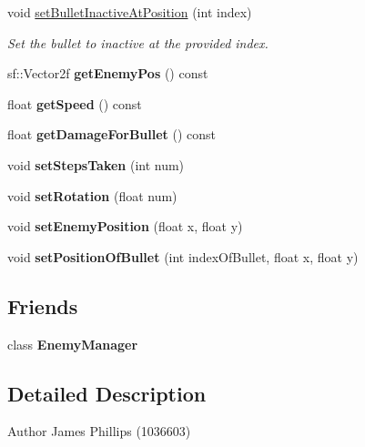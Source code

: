 \begin{DoxyCompactItemize}
void \hyperlink{class_enemy_a02e1cacf8fad39bbcc28271a53637024}{set\+Bullet\+Inactive\+At\+Position} (int index)
\begin{DoxyCompactList}\small\item\em Set the bullet to inactive at the provided index. \end{DoxyCompactList}\item 
\mbox{\label{class_enemy_a9f5b6b7b70f7f3532e82eebcab2e26e8}} 
sf\+::\+Vector2f {\bfseries get\+Enemy\+Pos} () const
\item 
\mbox{\label{class_enemy_a342051a8cf9fe6e329774e37af486fca}} 
float {\bfseries get\+Speed} () const
\item 
\mbox{\label{class_enemy_a73e88b0f1e68650e6ea536c53a3cf920}} 
float {\bfseries get\+Damage\+For\+Bullet} () const
\item 
\mbox{\label{class_enemy_a8ddda321d45a2fa6f35272087afe258b}} 
void {\bfseries set\+Steps\+Taken} (int num)
\item 
\mbox{\label{class_enemy_ad02b7dfac0339e110f9aba837a815782}} 
void {\bfseries set\+Rotation} (float num)
\item 
\mbox{\label{class_enemy_a6a83e4ff9dab297dbec1644dcc9152c6}} 
void {\bfseries set\+Enemy\+Position} (float x, float y)
\item 
\mbox{\label{class_enemy_a49e2b8533dc258764e7a0ee5c4990eeb}} 
void {\bfseries set\+Position\+Of\+Bullet} (int index\+Of\+Bullet, float x, float y)
\end{DoxyCompactItemize}
\subsection*{Friends}
\begin{DoxyCompactItemize}
\item 
\mbox{\label{class_enemy_a316703164b8c295e193f235a3c275003}} 
class {\bfseries Enemy\+Manager}
\end{DoxyCompactItemize}


\subsection{Detailed Description}
\begin{DoxyAuthor}{Author}
James Phillips (1036603) 
\end{DoxyAuthor}


